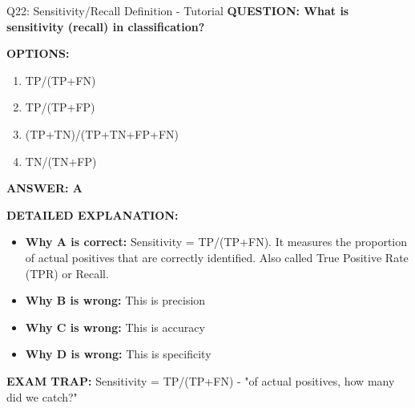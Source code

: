 \documentclass[8pt]{beamer}
\begin{document}
	\begin{frame}{Q22: Sensitivity/Recall Definition - Tutorial}
		\fontsize{6.5}{7.5}\selectfont
		\textbf{QUESTION: What is sensitivity (recall) in classification?}
		
		\vspace{0.1cm}
		\textbf{OPTIONS:}
		\begin{enumerate}
			\item TP/(TP+FN)
			\item TP/(TP+FP)
			\item (TP+TN)/(TP+TN+FP+FN)
			\item TN/(TN+FP)
		\end{enumerate}
		
		\vspace{0.1cm}
		\textcolor{myblue}{\textbf{ANSWER: A}}
		
		\vspace{0.1cm}
		\textbf{DETAILED EXPLANATION:}
		\begin{itemize}
			\item \textbf{Why A is correct:} Sensitivity = TP/(TP+FN). It measures the proportion of actual positives that are correctly identified. Also called True Positive Rate (TPR) or Recall.
			\item \textbf{Why B is wrong:} This is precision
			\item \textbf{Why C is wrong:} This is accuracy
			\item \textbf{Why D is wrong:} This is specificity
		\end{itemize}
		
		\textcolor{myred}{\textbf{EXAM TRAP:}} Sensitivity = \textcolor{myblue}{TP/(TP+FN)} - "of actual positives, how many did we catch?"
	\end{frame}
	
\end{document}
